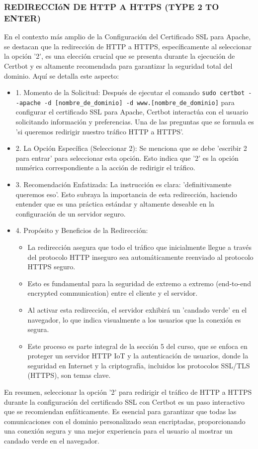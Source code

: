 \documentclass{report}
\begin{document}
\subsubsection{REDIRECCIóN DE HTTP A HTTPS (TYPE 2 TO ENTER)}
En el contexto más amplio de la Configuración del Certificado SSL para Apache, se  destacan que la redirección de HTTP a HTTPS, 
específicamente al seleccionar la opción '2', es una elección crucial que se presenta durante la ejecución de Certbot y es altamente 
recomendada para garantizar la seguridad total del dominio.
Aquí se detalla este aspecto:
\begin{itemize}
    \item 1. Momento de la Solicitud: Después de ejecutar el comando \verb|sudo certbot --apache -d [nombre_de_dominio] -d www.[nombre_de_dominio]| 
    para configurar el certificado SSL para Apache, Certbot interactúa con el usuario solicitando información y preferencias. Una de las 
    preguntas que se formula es 'si queremos redirigir nuestro tráfico HTTP a HTTPS'.
    \item 2. La Opción Específica (Seleccionar 2): Se menciona que se debe 'escribir 2 para entrar' para seleccionar esta opción. 
    Esto indica que '2' es la opción numérica correspondiente a la acción de redirigir el tráfico.
    \item 3. Recomendación Enfatizada: La instrucción es clara: 'definitivamente queremos eso'. Esto subraya la importancia de esta 
    redirección, haciendo entender que es una práctica estándar y altamente deseable en la configuración de un servidor seguro.
    \item 4. Propósito y Beneficios de la Redirección:
        \begin{itemize}
            \item La redirección asegura que todo el tráfico que inicialmente llegue a través del protocolo HTTP inseguro sea automáticamente 
            reenviado al protocolo HTTPS seguro.
            \item Esto es fundamental para la seguridad de extremo a extremo (end-to-end encrypted communication) entre el cliente y el servidor.
            \item Al activar esta redirección, el servidor exhibirá un 'candado verde' en el navegador, lo que indica visualmente a los 
            usuarios que la conexión es segura.
            \item Este proceso es parte integral de la sección 5 del curso, que se enfoca en proteger un servidor HTTP IoT y la autenticación 
            de usuarios, donde la seguridad en Internet y la criptografía, incluidos los protocolos SSL/TLS (HTTPS), son temas clave.
        \end{itemize}
\end{itemize}
En resumen, seleccionar la opción '2' para redirigir el tráfico de HTTP a HTTPS durante la configuración del certificado SSL con Certbot 
es un paso interactivo que se  recomiendan enfáticamente. Es esencial para garantizar que todas las comunicaciones con el dominio 
personalizado sean encriptadas, proporcionando una conexión segura y una mejor experiencia para el usuario al mostrar 
un candado verde en el navegador.
\end{document}
